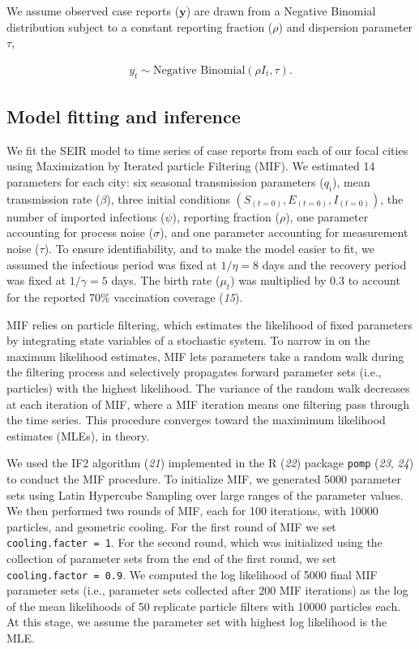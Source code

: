 \documentclass[3p]{elsarticle} %
\begin{document}
We assume observed case reports (\(\textbf{y}\)) are drawn from a
Negative Binomial distribution subject to a constant reporting fraction
(\(\rho\)) and dispersion parameter \(\tau\),

\begin{align}
y_t \sim \text{Negative Binomial} \left( \rho I_t, \tau \right).
\end{align}

\hypertarget{model-fitting-and-inference}{%
\subsection{Model fitting and
inference}\label{model-fitting-and-inference}}

We fit the SEIR model to time series of case reports from each of our
focal cities using Maximization by Iterated particle Filtering (MIF). We
estimated 14 parameters for each city: six seasonal transmission
parameters (\(q_i\)), mean transmission rate (\(\beta\)), three initial
conditions \(\left(S_{(t=0)},E_{(t=0)},I_{(t=0)}\right)\), the number of
imported infections (\(\psi\)), reporting fraction (\(\rho\)), one
parameter accounting for process noise (\(\sigma\)), and one parameter
accounting for measurement noise (\(\tau\)). To ensure identifiability,
and to make the model easier to fit, we assumed the infectious period
was fixed at \(1/\eta = 8\) days and the recovery period was fixed at
\(1/\gamma = 5\) days. The birth rate (\(\mu_t\)) was multiplied by 0.3
to account for the reported 70\% vaccination coverage (\emph{15}).

MIF relies on particle filtering, which estimates the likelihood of
fixed parameters by integrating state variables of a stochastic system.
To narrow in on the maximum likelihood estimates, MIF lets parameters
take a random walk during the filtering process and selectively
propagates forward parameter sets (i.e., particles) with the highest
likelihood. The variance of the random walk decreases at each iteration
of MIF, where a MIF iteration means one filtering pass through the time
series. This procedure converges toward the maximimum likelihood
estimates (MLEs), in theory.

We used the IF2 algorithm (\emph{21}) implemented in the R (\emph{22})
package \texttt{pomp} (\emph{23}, \emph{24}) to conduct the MIF
procedure. To initialize MIF, we generated 5000 parameter sets using
Latin Hypercube Sampling over large ranges of the parameter values. We
then performed two rounds of MIF, each for 100 iterations, with 10000
particles, and geometric cooling. For the first round of MIF we set
\texttt{cooling.facter\ =\ 1}. For the second round, which was
initialized using the collection of parameter sets from the end of the
first round, we set \texttt{cooling.factor\ =\ 0.9}. We computed the log
likelihood of 5000 final MIF parameter sets (i.e., parameter sets
collected after 200 MIF iterations) as the log of the mean likelihoods
of 50 replicate particle filters with 10000 particles each. At this
stage, we assume the parameter set with highest log likelihood is the
MLE.
\end{document}
